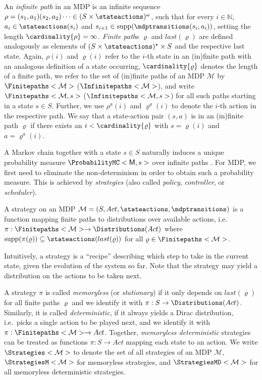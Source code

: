 \documentclass{article}
\newcommand{\Naturals}{\mathbb{N}}
\newcommand{\MC}{\mathsf{M}}
\newcommand{\MDP}{\mathcal{M}}
\newcommand{\States}{S}
\newcommand{\Actions}{Act}
\newcommand{\infinitepath}{\rho}
\newcommand{\finitepath}{\varrho}
\newcommand{\strategy}{\pi}
\newcommand{\last}[1]{last(#1)}
\DeclareMathOperator{\support}{supp}
\begin{document}
An \emph{infinite path} in an MDP is an infinite sequence $\infinitepath = (s_1, a_1) (s_2, a_2) \cdots \in (\States \times \stateactions)^\omega$, such that for every $i \in \Naturals$, $a_i \in \stateactions(s_i)$ and $s_{i+1} \in \support(\mdptransitions(s_i, a_i))$, setting the length $\cardinality{\infinitepath} = \infty$.
\emph{Finite path}s $\finitepath$ and $\last{\finitepath}$ are defined analogously as elements of $(\States \times \stateactions)^\star \times \States$ and the respective last state.
Again, $\infinitepath(i)$ and $\finitepath(i)$ refer to the $i$-th state in an (in)finite path with an analogous definition of a state occurring, $\cardinality{\finitepath}$ denotes the length of a finite path, we refer to the set of (in)finite paths of an MDP $\MDP$ by $\Finitepaths<\MDP>$ ($\Infinitepaths<\MDP>$), and write $\Finitepaths<\MDP, s>$ ($\Infinitepaths<\MDP, s>$) for all such paths starting in a state $s \in \States$.
Further, we use $\infinitepath^a(i)$ and $\finitepath^a(i)$ to denote the $i$-th action in the respective path.
We say that a state-action pair $(s,a)$ is in an (in)finite path $\finitepath$ if there exists an $i < \cardinality{\finitepath}$ with $s = \finitepath(i)$ and $a = \finitepath^a(i)$.

A Markov chain together with a state $s \in \States$ naturally induces a unique probability measure $\ProbabilityMC<\MC, s>$ over infinite paths \cite[Chapter~10]{DBLP:books/daglib/0020348}.
For MDP, we first need to eliminate the non-determinism in order to obtain such a probability measure.
This is achieved by \emph{strategies} (also called \emph{policy}, \emph{controller}, or \emph{scheduler}).

\begin{definition}
	A strategy on an MDP $\MDP = (\States, \Actions, \stateactions, \mdptransitions)$ is a function mapping finite paths to distributions over available actions, i.e.\ $\strategy : \Finitepaths<\MDP> \to \Distributions(\Actions)$ where $\support(\strategy(\finitepath)) \subseteq \stateactions(\last{\finitepath})$ for all $\finitepath \in \Finitepaths<\MDP>$.
\end{definition}
Intuitively, a strategy is a \enquote{recipe} describing which step to take in the current state, given the evolution of the system so far.
Note that the strategy may yield a distribution on the actions to be taken next.

A strategy $\strategy$ is called \emph{memoryless} (or \emph{stationary}) if it only depends on $\last{\finitepath}$ for all finite paths $\finitepath$ and we identify it with $\strategy : \States \to \Distributions(\Actions)$.
Similarly, it is called \emph{deterministic}, if it always yields a Dirac distribution, i.e.\ picks a single action to be played next, and we identify it with $\strategy : \Finitepaths<\MDP> \to \Actions$.
Together, \emph{memoryless deterministic} strategies can be treated as functions $\strategy : \States \to \Actions$ mapping each state to an action.
We write $\Strategies<\MDP>$ to denote the set of all strategies of an MDP $\MDP$, $\StrategiesM<\MDP>$ for memoryless strategies, and $\StrategiesMD<\MDP>$ for all memoryless deterministic strategies.
\end{document}
